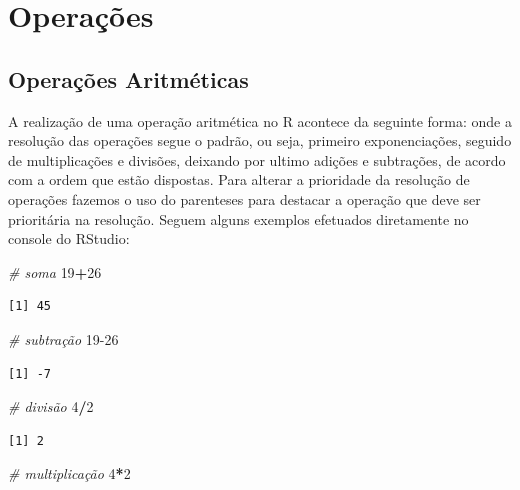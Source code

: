 \documentclass[12pt,brazil,oneside]{book}
\newenvironment{Shaded}{\begin{snugshade}}{\end{snugshade}}
\newcommand{\CommentTok}[1]{\textcolor[rgb]{0.56,0.35,0.01}{\textit{#1}}}
\newcommand{\DecValTok}[1]{\textcolor[rgb]{0.00,0.00,0.81}{#1}}
\newcommand{\OperatorTok}[1]{\textcolor[rgb]{0.81,0.36,0.00}{\textbf{#1}}}
\begin{document}
\hypertarget{operacoes}{%
\section{Operações}\label{operacoes}}

\hypertarget{operacoes-aritmeticas}{%
\subsection{Operações Aritméticas}\label{operacoes-aritmeticas}}

A realização de uma operação aritmética no R acontece da seguinte forma: onde a resolução das operações segue o padrão, ou seja, primeiro exponenciações, seguido de multiplicações e divisões, deixando por ultimo adições e subtrações, de acordo com a ordem que estão dispostas. Para alterar a prioridade da resolução de operações fazemos o uso do parenteses para destacar a operação que deve ser prioritária na resolução. Seguem alguns exemplos efetuados diretamente no console do RStudio:

\begin{Shaded}
\begin{Highlighting}[]
\CommentTok{# soma}
\DecValTok{19}\OperatorTok{+}\DecValTok{26}
\end{Highlighting}
\end{Shaded}

\begin{verbatim}
[1] 45
\end{verbatim}

\begin{Shaded}
\begin{Highlighting}[]
\CommentTok{# subtração}
\DecValTok{19-26}
\end{Highlighting}
\end{Shaded}

\begin{verbatim}
[1] -7
\end{verbatim}

\begin{Shaded}
\begin{Highlighting}[]
\CommentTok{# divisão}
\DecValTok{4}\OperatorTok{/}\DecValTok{2}
\end{Highlighting}
\end{Shaded}

\begin{verbatim}
[1] 2
\end{verbatim}

\begin{Shaded}
\begin{Highlighting}[]
\CommentTok{# multiplicação }
\DecValTok{4}\OperatorTok{*}\DecValTok{2}
\end{Highlighting}
\end{Shaded}
\end{document}
